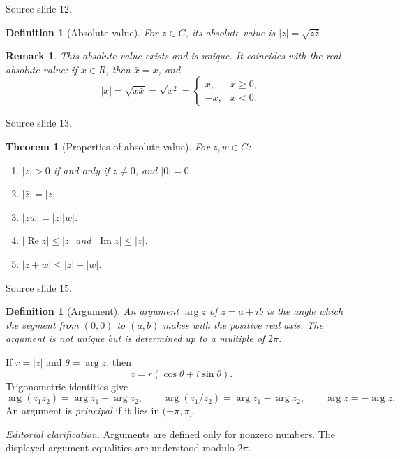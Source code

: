 \documentclass[10pt,letterpaper,twoside,openright]{amsbook}
\numberwithin{equation}{subsection}
\theoremstyle{sea-plain}
\newtheorem{theorem}[subsection]{Theorem}
\theoremstyle{sea-definition}
\newtheorem{definition}[subsection]{Definition}
\newtheorem{remark}[subsection]{Remark}
\theoremstyle{sea-exercise}
\DeclareMathOperator{\Real}{Re}
\DeclareMathOperator{\Imag}{Im}
\newcommand{\RR}{\mathbb{R}}
\newcommand{\CC}{\mathbb{C}}
\newcommand{\DD}{\mathbb{D}}
\newcommand{\HH}{\mathbb{H}}
\newcommand{\Chat}{\mathbb{C}_{\infty}}
\def\CC{C}\def\RR{R}\def\DD{D}\def\HH{H}\def\Chat{C infinity}}
\newcommand{\src}[1]{\par\smallskip\noindent
 {\scriptsize\sffamily\color{SoftWhite}Source slide #1.}\par\nopagebreak\smallskip}
\newcommand{\editorial}[1]{\par\smallskip\noindent
 {\small\textit{Editorial clarification.} #1}\par\smallskip}
\begin{document}
\src{12}
\begin{definition}[Absolute value]
For $z\in\CC$, its absolute value is $|z|=\sqrt{z\bar z}$.
\end{definition}
\begin{remark}
This absolute value exists and is unique. It coincides with the real
absolute value: if $x\in\RR$, then $\bar x=x$, and
\[
 |x|=\sqrt{x\bar x}=\sqrt{x^2}
 =\begin{cases}x,&x\geq0,\\-x,&x<0.\end{cases}
\]
\end{remark}
\src{13}
\begin{theorem}[Properties of absolute value]
For $z,w\in\CC$:
\begin{enumerate}[label=(\roman*)]
\item $|z|>0$ if and only if $z\ne0$, and $|0|=0$.
\item $|\bar z|=|z|$.
\item $|zw|=|z||w|$.
\item $|\Real z|\leq|z|$ and $|\Imag z|\leq|z|$.
\item $|z+w|\leq|z|+|w|$.
\end{enumerate}
\end{theorem}
\src{15}
\begin{definition}[Argument]
An argument $\arg z$ of $z=a+ib$ is the angle which the segment from
$(0,0)$ to $(a,b)$ makes with the positive real axis. The argument is not
unique but is determined up to a multiple of $2\pi$.
\end{definition}
If $r=|z|$ and $\theta=\arg z$, then
\[
 z=r(\cos\theta+i\sin\theta).
\]
Trigonometric identities give
\[
 \arg(z_1z_2)=\arg z_1+\arg z_2,\qquad
 \arg(z_1/z_2)=\arg z_1-\arg z_2,\qquad
 \arg\bar z=-\arg z.
\]
An argument is \emph{principal} if it lies in $(-\pi,\pi]$.
\editorial{Arguments are defined only for nonzero numbers. The displayed
argument equalities are understood modulo $2\pi$.}
\end{document}
